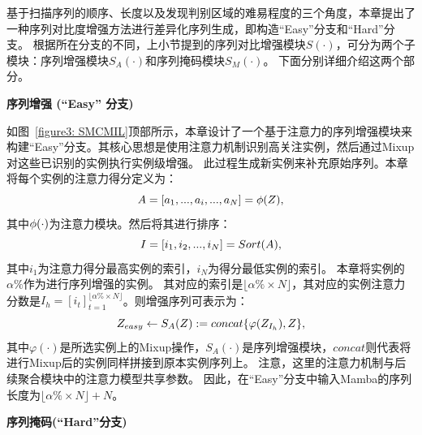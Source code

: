 基于扫描序列的顺序、长度以及发现判别区域的难易程度的三个角度，本章提出了一种序列对比度增强方法进行差异化序列生成，即构造“Easy”分支和“Hard”分支。
根据所在分支的不同，上小节提到的序列对比增强模块$S(\cdot)$，可分为两个子模块：序列增强模块$S_A(\cdot)$和序列掩码模块$S_M(\cdot)$。
下面分别详细介绍这两个部分。

\textbf{序列增强 (“Easy” 分支)} 

如图~\ref{figure3: SMCMIL}顶部所示，本章设计了一个基于注意力的序列增强模块来构建“Easy”分支。其核心思想是使用注意力机制识别高关注实例，然后通过Mixup对这些已识别的实例执行实例级增强。
此过程生成新实例来补充原始序列。本章将每个实例的注意力得分定义为：
\begin{equation}
  \mathnormal{A}=[a_1,...,a_i,...,a_N]=\mathnormal{\phi}(\mathnormal{Z}),
  \label{eq8}
  \end{equation}
其中$\mathnormal{\phi}(\cdot)$为注意力模块。然后将其进行排序：
\begin{equation}
  \mathnormal{I}=[i_1,i_2,...,i_N]=Sort(\mathnormal{A}),
  \label{eq9}
  \end{equation}
其中$i_1$为注意力得分最高实例的索引，$i_N$为得分最低实例的索引。
本章将实例的$\alpha\%$作为进行序列增强的实例。
其对应的索引是$\lfloor \alpha\% \times N \rfloor$，其对应的实例注意力分数是$I_h=[i_t]^{\lfloor \alpha\% \times N \rfloor}_{t=1}$。则增强序列可表示为：
\begin{equation}
  \mathnormal{Z_{easy}}\leftarrow S_A(Z):=concat\{\varphi(Z_{\mathnormal{I}_h}),Z\},
  \label{eq10}
  \end{equation}
其中$\varphi(\cdot)$是所选实例上的Mixup操作，$S_A(\cdot)$是序列增强模块，$concat$则代表将进行Mixup后的实例同样拼接到原本实例序列上。
注意，这里的注意力机制与后续聚合模块中的注意力模型共享参数。
因此，在“Easy”分支中输入Mamba的序列长度为$\lfloor \alpha\% \times N \rfloor + N$。

\textbf{序列掩码(“Hard”分支)} 

